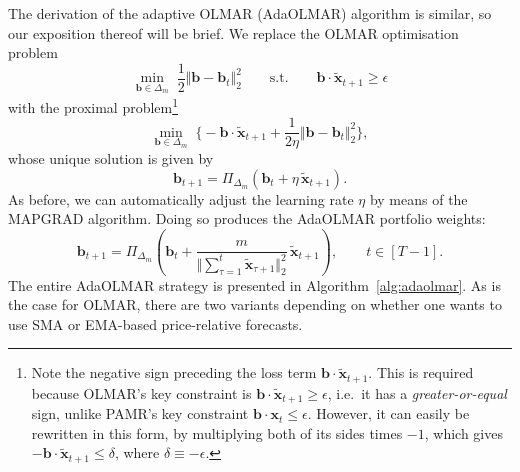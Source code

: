 The derivation of the adaptive OLMAR (AdaOLMAR) algorithm is similar, so our exposition thereof will be brief. We replace the OLMAR optimisation problem
\begin{equation}
\label{eq:olmar-optpb}
	\min_{\mathbf{b}\in\Delta_m} \; \frac{1}{2}\Vert\mathbf{b} - \mathbf{b}_t\Vert_2^2
	\qquad \text{s.t.} \qquad \mathbf{b} \cdot \widetilde{\mathbf{x}}_{t+1} \geq \epsilon
\end{equation}
with the proximal problem\footnote{Note the negative sign preceding the loss term $\mathbf{b} \cdot \widetilde{\mathbf{x}}_{t+1}$. This is required because OLMAR's key constraint is $\mathbf{b} \cdot \widetilde{\mathbf{x}}_{t+1} \geq \epsilon$, i.e.\ it has a \emph{greater-or-equal} sign, unlike PAMR's key constraint $\mathbf{b} \cdot \mathbf{x}_t \leq \epsilon$. However, it can easily be rewritten in this form, by multiplying both of its sides times $-1$, which gives $-\mathbf{b} \cdot \widetilde{\mathbf{x}}_{t+1} \leq \delta$, where $\delta \equiv -\epsilon$.}
\begin{equation}
\label{eq:olmar-optpb-ogdform}
	\min_{\mathbf{b}\in\Delta_m} \; \Big\{-\mathbf{b} \cdot \widetilde{\mathbf{x}}_{t+1} + \frac{1}{2\eta}\Vert\mathbf{b} - \mathbf{b}_t\Vert_2^2\Big\},
\end{equation}
whose unique solution is given by
\begin{equation}
\label{eq:olmar-portfolio}
	\mathbf{b}_{t+1}
	= \Pi_{\Delta_m}(\mathbf{b}_t + \eta\,\widetilde{\mathbf{x}}_{t+1}).
\end{equation}
As before, we can automatically adjust the learning rate $\eta$ by means of the MAPGRAD algorithm. Doing so produces the AdaOLMAR portfolio weights:
\begin{equation}
\label{eq:adaolmar-portfolio}
	\mathbf{b}_{t+1}
	= \Pi_{\Delta_m}\left(\mathbf{b}_t + \frac{m}{\Vert\sum_{\tau=1}^{t}\widetilde{\mathbf{x}}_{\tau+1}\Vert^2_2}\,\widetilde{\mathbf{x}}_{t+1}\right),
	\qquad t \in [T-1].
\end{equation}
The entire AdaOLMAR strategy is presented in Algorithm~\ref{alg:adaolmar}. As is the case for OLMAR, there are two variants depending on whether one wants to use SMA or EMA-based price-relative forecasts.
